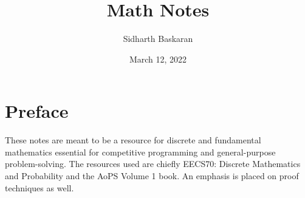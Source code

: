 \documentclass[12pt]{article}
\title{Math Notes}
\author{Sidharth Baskaran}
\date{March 12, 2022}
\begin{document}
\maketitle

\tableofcontents
\newpage

\section*{Preface}

These notes are meant to be a resource for discrete and fundamental mathematics
essential for competitive programming and general-purpose problem-solving.
The resources used are chiefly EECS70: Discrete Mathematics and Probability and the AoPS Volume 1 book.
An emphasis is placed on proof techniques as well.



\end{document}
